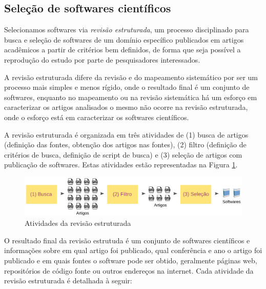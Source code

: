 \subsection{Seleção de softwares científicos}

Selecionamos softwares via {\it revisão estruturada}, um processo disciplinado
para busca e seleção de softwares de um domínio específico publicados em
artigos acadêmicos a partir de critérios bem definidos, de forma que seja
possível a reprodução do estudo por parte de pesquisadores interessados.

A revisão estruturada difere da revisão e do mapeamento sistemático
\cite{Kitchenham2007} por ser um processo mais simples e menos rígido, onde o
resultado final é um conjunto de softwares, enquanto no mapeamento ou na
revisão sistemática há um esforço em caracterizar os artigos analisados o mesmo
não ocorre na revisão estruturada, onde o esforço está em caracterizar os
softwares científicos.

A revisão estruturada é organizada em três atividades de (1) busca de artigos
(definição das fontes, obtenção dos artigos nas fontes), (2) filtro (definição
de critérios de busca, definição de script de busca) e (3) seleção de artigos
com publicação de softwares. Estas atividades estão representadas na Figura
\ref{figura-revisao-estruturada}.

\begin{figure}[h]
  \center
  \includegraphics[scale=0.21]{imagens/revisao-estruturada.png}
  \caption{Atividades da revisão estruturada}
  \label{figura-revisao-estruturada}
\end{figure}

O resultado final da revisão estrutuda é um conjunto de softwares científicos e
informações sobre em qual artigo foi publicado, qual conferência e ano o artigo
foi publicado e em quais fontes o software pode ser obtido, geralmente páginas
web, repositórios de código fonte ou outros endereços na internet. Cada
atividade da revisão estruturada é detalhada à seguir:

